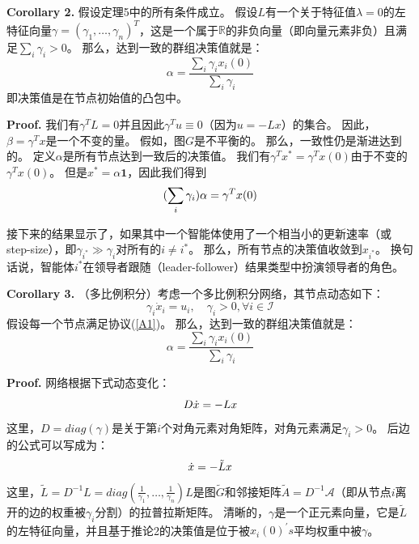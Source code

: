 \documentclass{article}
\begin{document}
\noindent \textbf{Corollary 2.} 假设定理5中的所有条件成立。
假设$L$有一个关于特征值$\lambda=0$的左特征向量$\gamma = (\gamma_1, \dots, \gamma_n)^T$，这是一个属于$\mathbb{R}$的非负向量（即向量元素非负）且满足$\sum_i\gamma_i>0$。
那么，达到一致的群组决策值就是：
\begin{equation}
    \alpha = \frac{\sum_i \gamma_ix_i(0)}{\sum_i\gamma_i}
    \tag{19}
    \label{19}
\end{equation}
即决策值是在节点初始值的凸包中。

\noindent \textbf{Proof.} 
我们有$\gamma^TL=0$并且因此$\gamma^Tu\equiv0$（因为$u=-Lx$）的集合。
因此，$\beta=\gamma^Tx$是一个不变的量。
假如，图$G$是不平衡的。
那么，一致性仍是渐进达到的。
定义$\alpha$是所有节点达到一致后的决策值。
我们有$\gamma^Tx^*=\gamma^Tx(0)$由于不变的$\gamma^Tx(0)$。
但是$x^*=\alpha\mathbf{1}$，因此我们得到
\begin{equation}
    (\sum_i\gamma_i)\alpha = \gamma^Tx(0)
    \notag
\end{equation}

接下来的结果显示了，如果其中一个智能体使用了一个相当小的更新速率（或step-size），即$\gamma_{i^*}\gg\gamma_i$对所有的$i\ne i^*$。
那么，所有节点的决策值收敛到$x_{i^*}$。
换句话说，智能体$i^*$在领导者跟随（leader-follower）结果类型中扮演领导者的角色。

\noindent \textbf{Corollary 3.} （多比例积分）考虑一个多比例积分网络，其节点动态如下：
\begin{equation}
    \gamma_i \dot{x}_i=u_i,\quad \gamma_i>0,\forall i \in \mathcal{I}
    \tag{20}
    \label{20}
\end{equation}
假设每一个节点满足协议(\ref{A1})。
那么，达到一致的群组决策值就是：
\begin{equation}
    \alpha = \frac{\sum_i \gamma_ix_i(0)}{\sum_i\gamma_i}
    \tag{21}
    \label{21}
\end{equation}

\noindent \textbf{Proof.} 网络根据下式动态变化：
\begin{equation}
    D\dot{x} = -Lx
    \notag
\end{equation}
这里，$D=diag(\gamma)$是关于第$i$个对角元素对角矩阵，对角元素满足$\gamma_i>0$。
后边的公式可以写成为：
\begin{equation}
    \dot{x} = -\tilde{L}x
    \notag
\end{equation}
这里，$\tilde{L} = D^{-1}L = diag(\frac{1}{\gamma_1},\dots,\frac{1}{\gamma_n})L$是图$\tilde{G}$和邻接矩阵$\tilde{A}=D^{-1}\mathcal{A}$（即从节点$i$离开的边的权重被$\gamma_i$分割）的拉普拉斯矩阵。
清晰的，$\gamma$是一个正元素向量，它是$\tilde{L}$的左特征向量，并且基于推论2的决策值是位于被$x_i(0)^\prime s$平均权重中被$\gamma$。
\end{document}
